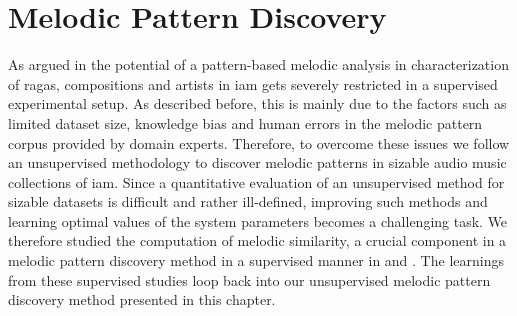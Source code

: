 

\section{Melodic Pattern Discovery}
\label{sec:patterns_melodic_pattern_discovery}

As argued in  the potential of a pattern-based melodic analysis in characterization of \glspl{raga}, compositions and artists  in \gls{iam} gets severely restricted in a supervised experimental setup. As described before, this is mainly due to the factors such as limited dataset size, knowledge bias and human errors in the melodic pattern corpus provided by domain experts. Therefore, to overcome these issues we follow an unsupervised methodology to discover melodic patterns in sizable audio music collections of \gls{iam}. Since a quantitative evaluation of an unsupervised method for sizable datasets is difficult and rather ill-defined, improving such methods and learning optimal values of the system parameters becomes a challenging task. We therefore studied the computation of melodic similarity, a crucial component in a melodic pattern discovery method in a supervised manner in  and . The learnings from these supervised studies loop back into our unsupervised melodic pattern discovery method presented in this chapter. 

